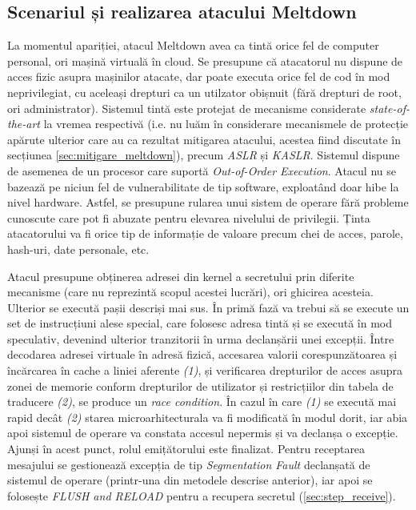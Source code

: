 \subsection{Scenariul și realizarea atacului Meltdown}

La momentul apariției, atacul Meltdown avea ca tintă orice fel de computer
personal, ori mașină virtuală în cloud. Se presupune că atacatorul nu dispune
de acces fizic asupra mașinilor atacate, dar poate executa orice fel de cod în mod
neprivilegiat, cu aceleași drepturi ca un utilzator obișnuit (fără drepturi de
root, ori administrator). Sistemul tintă este protejat de mecanisme considerate
\emph{state-of-the-art} la vremea respectivă (i.e. nu luăm în considerare
mecanismele de protecție apărute ulterior care au ca rezultat mitigarea
atacului, acestea fiind discutate în secțiunea \ref{sec:mitigare_meltdown}),
precum \emph{ASLR} și \emph{KASLR}. Sistemul dispune de asemenea de un
procesor care suportă \emph{Out-of-Order Execution}. Atacul nu se bazează pe
niciun fel de vulnerabilitate de tip software, exploatând doar hibe la nivel
hardware. Astfel, se presupune rularea unui sistem de operare fără probleme
cunoscute care pot fi abuzate pentru elevarea nivelului de privilegii. Ținta
atacatorului va fi orice tip de informație de valoare precum chei de acces,
parole, hash-uri, date personale, etc.

Atacul presupune obținerea adresei din kernel a secretului prin diferite
mecanisme (care nu reprezintă scopul acestei lucrări), ori ghicirea acesteia.
Ulterior se execută pașii descriși mai sus. În primă fază va trebui să se
execute un set de instrucțiuni alese special, care folosesc adresa tintă și se execută
în mod speculativ, devenind ulterior tranzitorii în urma
declanșării unei excepții. Între decodarea adresei virtuale în adresă fizică,
accesarea valorii corespunzătoarea și încărcarea în cache a liniei
aferente \emph{(1)}, și verificarea drepturilor de acces asupra zonei de
memorie conform drepturilor de utilizator și restricțiilor din tabela de
traducere \emph{(2)}, se produce un \emph{race condition}. În cazul în care
\emph{(1)} se execută mai rapid decât \emph{(2)} starea microarhitecturala va
fi modificată în modul dorit, iar abia apoi sistemul de operare va constata
accesul nepermis și va declanșa o excepție. Ajunși în acest punct, rolul
emițătorului este finalizat. Pentru receptarea mesajului se gestionează
excepția de tip \emph{Segmentation Fault} declanșată de sistemul de operare
(printr-una din metodele descrise anterior), iar apoi se folosește \emph{FLUSH
and RELOAD} pentru a recupera secretul (\ref{sec:step_receive}).

